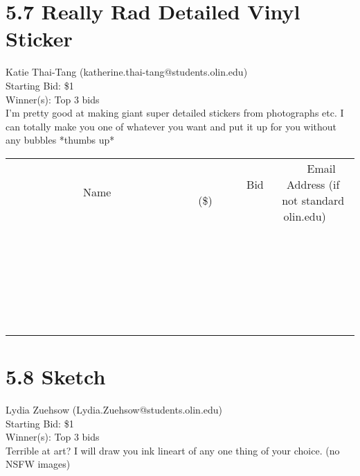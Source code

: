 \documentclass[11pt]{article}
\begin{document}
					\section*{5.7 Really Rad Detailed Vinyl Sticker}
					Katie Thai-Tang (katherine.thai-tang@students.olin.edu) \\
					Starting Bid: \$1 \\
					Winner(s): Top 3 bids \\
					I'm pretty good at making giant super detailed stickers from photographs etc. I can totally make you one of whatever you want and put it up for you without any bubbles *thumbs up* \\
					[6ex]
					\begin{tabular}{c c c}
						~~~~~~~~~~~~~Name~~~~~~~~~~~~~ & ~~~~~~~~~Bid (\$)~~~~~~~~~ & ~~~Email Address (if not standard olin.edu)~~~ \\
				
 & & \\
\hline
 & & \\
\hline
 & & \\
\hline
 & & \\
\hline
 & & \\
\hline
 & & \\
\hline
 & & \\
\hline
 & & \\
\hline
 & & \\
\hline
 & & \\
\hline
 & & \\
\hline
 & & \\
\hline
 & & \\
\hline
 & & \\
\hline
 & & \\
\hline
 & & \\
\hline
 & & \\
\hline
 & & \\
\hline
 & & \\
\hline
 & & \\
\hline
 & & \\
\hline
 & & \\
\hline
 & & \\
\hline
 & & \\
\hline
 & & \\
\hline
 & & \\
\hline
					\end{tabular}
					\clearpage
				
					\section*{5.8 Sketch}
					Lydia Zuehsow (Lydia.Zuehsow@students.olin.edu) \\
					Starting Bid: \$1 \\
					Winner(s): Top 3 bids \\
					Terrible at art?
I will draw you ink lineart of any one thing of your choice.
(no NSFW images)
\end{document}
